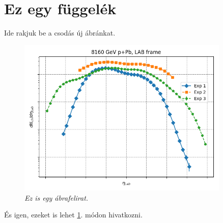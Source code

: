 \documentclass[a4paper, 12pt]{article}
\numberwithin{equation}{section}          %
\numberwithin{figure}{subsection}
\begin{document}

\newpage \vspace*{2cm}

       
       
%
% 


\newpage \vspace*{2cm}

\pagestyle{fancy}

\appendix
\section{Ez egy függelék}
\label{app:fugg}

Ide rakjuk be a csodás új ábránkat.

\begin{figure}[h!]
    \begin{center}
    \includegraphics[width=0.9\textwidth]{./../python/plot1}
    \end{center}
      \caption{\textit{Ez is egy ábrafelirat.}}
    \label{fig:abra2}
    \end{figure}

És igen, ezeket is lehet \ref{app:fugg}. módon hivatkozni.


\end{document}
